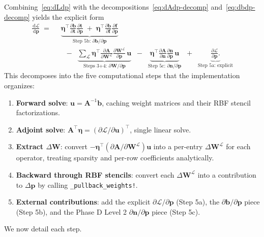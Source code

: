 \documentclass[11pt,a4paper]{article}
\newcommand{\mat}[1]{\mathbf{#1}}
\newcommand{\vect}[1]{\boldsymbol{#1}}
\newcommand{\pts}{\vect{p}}
\newcommand{\dd}{\,\mathrm{d}}
\newcommand{\Loss}{\mathcal{L}}
\begin{document}
Combining~\eqref{eq:dLdp} with the decompositions~\eqref{eq:dAdp-decomp}
and~\eqref{eq:dbdp-decomp} yields the explicit form
\begin{equation}
  \begin{split}
  \frac{\dd\Loss}{\dd\pts}
  \;=\;\;&
  \underbrace{
    \vect\eta^\top \frac{\partial\vect b}{\partial\vect t}
    \frac{\partial\vect t}{\partial\pts}
    \;+\;
    \vect\eta^\top \frac{\partial\vect b}{\partial\vect f}
    \frac{\partial\vect f}{\partial\pts}
  }_{\text{Step 5b: }\partial\vect b/\partial\pts}
  \\
  &\;\;-\;\;
  \underbrace{
    \sum_{\mathcal L}
    \vect\eta^\top \frac{\partial\mat A}{\partial\mat W^{\mathcal L}}
    \frac{\partial\mat W^{\mathcal L}}{\partial\pts}\,\vect u
  }_{\text{Steps 3+4: } \partial\mat W/\partial\pts}
  \;\;-\;\;
  \underbrace{
    \vect\eta^\top \frac{\partial\mat A}{\partial\vect n}
    \frac{\partial\vect n}{\partial\pts}\,\vect u
  }_{\text{Step 5c: } \partial\vect n/\partial\pts}
  \;\;+\;\;
  \underbrace{
    \frac{\partial\Loss}{\partial\pts}.
  }_{\text{Step 5a: explicit}}
  \end{split}
  \label{eq:five-pieces}
\end{equation}
This decomposes into the five computational steps that the
implementation organizes:
\begin{enumerate}
  \item \textbf{Forward solve}: $\vect u = \mat A^{-1}\vect b$,
        caching weight matrices and their RBF stencil factorizations.
  \item \textbf{Adjoint solve}: $\mat A^\top \vect\eta
        = (\partial\Loss/\partial\vect u)^\top$, single linear solve.
  \item \textbf{Extract $\Delta\mat W$}: convert
        $-\vect\eta^\top (\partial\mat A/\partial\mat W^{\mathcal L})
        \vect u$ into a per-entry $\Delta\mat W^{\mathcal L}$ for each
        operator, treating sparsity and per-row coefficients
        analytically.
  \item \textbf{Backward through RBF stencils}: convert each
        $\Delta\mat W^{\mathcal L}$ into a contribution to
        $\Delta\pts$ by calling
        \texttt{\_pullback\_weights!}.
  \item \textbf{External contributions}: add the explicit
        $\partial\Loss/\partial\pts$ (Step 5a), the
        $\partial\vect b/\partial\pts$ piece (Step 5b), and the
        Phase D Level 2 $\partial\vect n/\partial\pts$ piece
        (Step 5c).
\end{enumerate}
We now detail each step.
\end{document}

